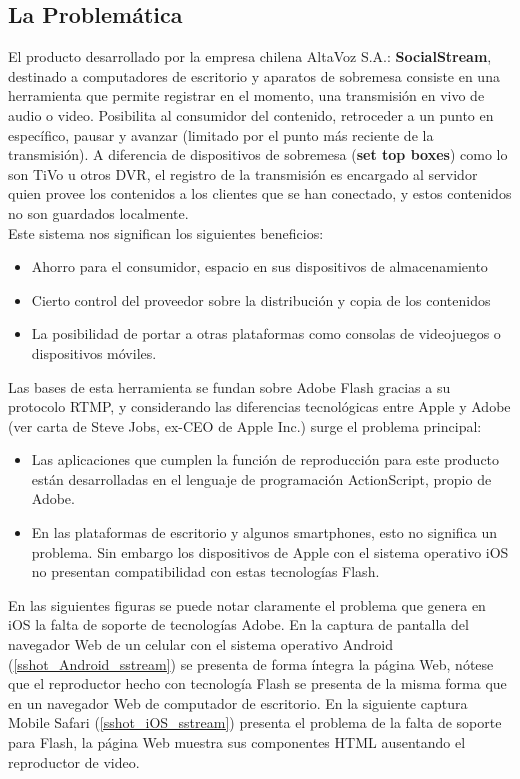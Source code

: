 \subsection{La Problemática}
El producto desarrollado por la empresa chilena AltaVoz S.A.: \textbf{SocialStream}, destinado a computadores de escritorio y aparatos de sobremesa consiste en una herramienta que permite registrar en el momento, una transmisión en vivo de audio o video. Posibilita al consumidor del contenido, retroceder a un punto en específico, pausar  y avanzar (limitado por el punto más reciente de la transmisión). 
A diferencia de dispositivos de sobremesa (\textbf{set top boxes}) como lo son TiVo u otros DVR, el registro de la transmisión es encargado al servidor quien provee los contenidos a los clientes que se han conectado, y estos contenidos no son guardados localmente. \\

Este sistema nos significan los siguientes beneficios: 
\begin{itemize}
\item Ahorro para el consumidor, espacio en sus dispositivos de almacenamiento
\item Cierto control del proveedor sobre la distribución  y copia de los contenidos
\item La posibilidad de portar a otras plataformas como consolas de videojuegos o dispositivos móviles.
\end{itemize}

Las bases de esta herramienta se fundan sobre Adobe Flash gracias a su protocolo RTMP, y considerando las diferencias tecnológicas entre Apple y Adobe (ver \cite{sota:steve-flash} carta de Steve Jobs, ex-CEO de Apple Inc.) surge el problema principal:

\begin{itemize}
\item Las aplicaciones que cumplen la función de reproducción para este producto están desarrolladas en el lenguaje de programación ActionScript, propio de Adobe.
\item En las plataformas de escritorio y algunos smartphones, esto no significa un problema. Sin embargo los dispositivos de Apple con el sistema operativo iOS no presentan compatibilidad con estas tecnologías Flash.
\end{itemize}

	En las siguientes figuras se puede notar claramente el problema que genera en iOS la falta de soporte de tecnologías Adobe. 
	En la captura de pantalla del navegador Web de un celular con el sistema operativo Android (\ref{sshot_Android_sstream}) se presenta de forma íntegra la página Web, nótese que el reproductor hecho con tecnología Flash se presenta de la misma forma que en un navegador Web de computador de escritorio. 
	En la siguiente captura Mobile Safari (\ref{sshot_iOS_sstream}) presenta el problema de la falta de soporte para Flash, la página Web muestra sus componentes HTML ausentando el reproductor de video.

